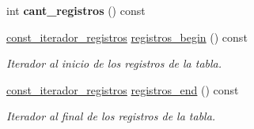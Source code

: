 \begin{DoxyCompactItemize}
\item 
\hypertarget{classTabla_ae25724a86075dd5121b07446c92e94c6}{int {\bfseries cant\+\_\+registros} () const }\label{classTabla_ae25724a86075dd5121b07446c92e94c6}

\item 
\hyperlink{classTabla_1_1const__iterador__registros}{const\+\_\+iterador\+\_\+registros} \hyperlink{classTabla_aafc1aedd4c2c222387591c3b772d56a9}{registros\+\_\+begin} () const 
\begin{DoxyCompactList}\small\item\em Iterador al inicio de los registros de la tabla. \end{DoxyCompactList}\item 
\hyperlink{classTabla_1_1const__iterador__registros}{const\+\_\+iterador\+\_\+registros} \hyperlink{classTabla_ac736bbd3065cc25c36ef258fcddaea50}{registros\+\_\+end} () const 
\begin{DoxyCompactList}\small\item\em Iterador al final de los registros de la tabla. \end{DoxyCompactList}\end{DoxyCompactItemize}

